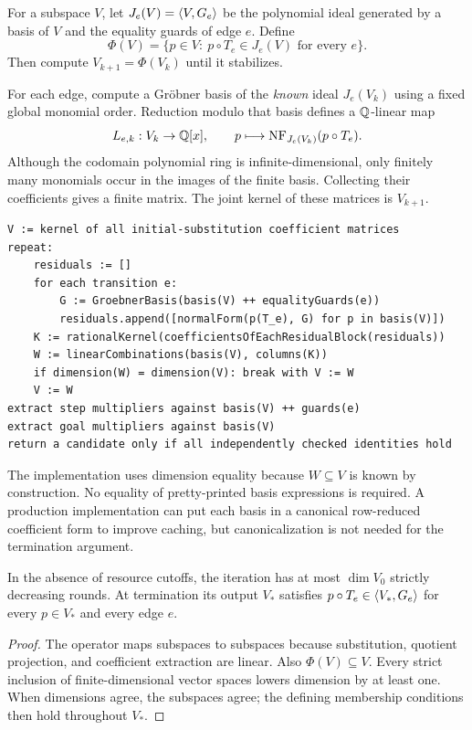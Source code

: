 For a subspace $V$, let $J_e(V)=\left\langle V,G_e\right\rangle$ be the polynomial ideal generated
by a basis of $V$ and the equality guards of edge $e$. Define
\begin{equation}
 \Phi(V)=\{p\in V:\ p\circ T_e\in J_e(V)\text{ for every }e\}.
 \label{eq:ideal-operator}
\end{equation}
Then compute $V_{k+1}=\Phi(V_k)$ until it stabilizes.

For each edge, compute a Gr\"obner basis of the \emph{known} ideal $J_e(V_k)$
using a fixed global monomial order. Reduction modulo that basis defines a
$\mathbb{Q}$-linear map
\[
 L_{e,k}:V_k\to\mathbb{Q}[x],\qquad
 p\longmapsto\operatorname{NF}_{J_e(V_k)}(p\circ T_e).
\]
Although the codomain polynomial ring is infinite-dimensional, only finitely
many monomials occur in the images of the finite basis. Collecting their
coefficients gives a finite matrix. The joint kernel of these matrices is
$V_{k+1}$.

\par\noindent\begin{minipage}{\linewidth}
\begin{lstlisting}
V := kernel of all initial-substitution coefficient matrices
repeat:
    residuals := []
    for each transition e:
        G := GroebnerBasis(basis(V) ++ equalityGuards(e))
        residuals.append([normalForm(p(T_e), G) for p in basis(V)])
    K := rationalKernel(coefficientsOfEachResidualBlock(residuals))
    W := linearCombinations(basis(V), columns(K))
    if dimension(W) = dimension(V): break with V := W
    V := W
extract step multipliers against basis(V) ++ guards(e)
extract goal multipliers against basis(V)
return a candidate only if all independently checked identities hold
\end{lstlisting}
\end{minipage}\par

The implementation uses dimension equality because $W\subseteq V$ is known by
construction. No equality of pretty-printed basis expressions is required.
A production implementation can put each basis in a canonical row-reduced
coefficient form to improve caching, but canonicalization is not needed for the
termination argument.

\begin{theorem}
In the absence of resource cutoffs, the iteration has at most $\dim V_0$
strictly decreasing rounds. At termination its output $V_*$ satisfies
$p\circ T_e\in\left\langle V_*,G_e\right\rangle$ for every $p\in V_*$ and every edge $e$.
\end{theorem}
\begin{proof}
The operator maps subspaces to subspaces because substitution, quotient
projection, and coefficient extraction are linear. Also $\Phi(V)\subseteq V$.
Every strict inclusion of finite-dimensional vector spaces lowers dimension by
at least one. When dimensions agree, the subspaces agree; the defining
membership conditions then hold throughout $V_*$.
\end{proof}

